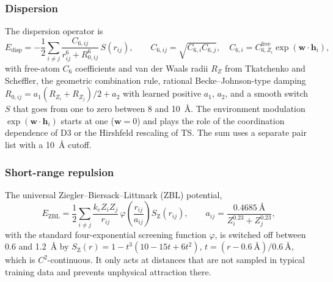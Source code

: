 \documentclass[journal=jctcce,manuscript=article,layout=traditional]{achemso}
\newcommand{\vect}[1]{\bm{#1}}
\begin{document}
\subsubsection{Dispersion}
The dispersion operator is
\begin{equation}
E_\text{disp}=-\frac12\sum_{i\ne j}\frac{C_{6,ij}}{r_{ij}^6+R_{0,ij}^6}\,S(r_{ij}),\qquad
C_{6,ij}=\sqrt{C_{6,i}C_{6,j}},\quad C_{6,i}=C_{6,Z_i}^\text{free}\exp(\vect w\cdot\vect h_i),
\label{eq:disp}
\end{equation}
with free-atom $C_6$ coefficients and van der Waals radii $R_Z$ from Tkatchenko and Scheffler\cite{tkatchenko2009},
the geometric combination rule, rational Becke--Johnson-type damping\cite{grimme2011bj}
$R_{0,ij}=a_1(R_{Z_i}+R_{Z_j})/2+a_2$ with learned positive $a_1$, $a_2$, and a smooth switch $S$ that goes from one to
zero between 8 and 10~\AA. The environment modulation $\exp(\vect w\cdot\vect h_i)$ starts at one ($\vect w=0$) and
plays the role of the coordination dependence of D3\cite{grimme2010d3} or the Hirshfeld rescaling of TS. The sum
uses a separate pair list with a 10~\AA{} cutoff.

\subsubsection{Short-range repulsion}
The universal Ziegler--Biersack--Littmark (ZBL) potential\cite{ziegler1985zbl},
\begin{equation}
E_\text{ZBL}=\frac12\sum_{i\ne j}\frac{k_eZ_iZ_j}{r_{ij}}\,\varphi\!\left(\frac{r_{ij}}{a_{ij}}\right)S_\text{Z}(r_{ij}),
\qquad a_{ij}=\frac{0.4685~\text{\AA}}{Z_i^{0.23}+Z_j^{0.23}},
\end{equation}
with the standard four-exponential screening function $\varphi$, is switched off between 0.6 and 1.2~\AA{} by
$S_\text{Z}(r)=1-t^3(10-15t+6t^2)$, $t=(r-0.6~\text{\AA})/0.6~\text{\AA}$, which is $C^2$-continuous. It only acts at
distances that are not sampled in typical training data and prevents unphysical attraction there.
\end{document}
